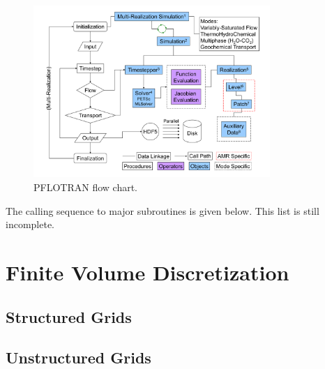 \documentclass[12pt]{article}
\begin{document}
\begin{figure}[ht]\centering
\includegraphics[width=0.8\textwidth]{./figs/multi-realization_flowchart}

\vspace{3mm}

\caption{PFLOTRAN flow chart.}
\label{fchart}
\end{figure}

\noindent
The calling sequence to major subroutines is given below. This list is still incomplete.


\normalsize


\section{Finite Volume Discretization}

\subsection{Structured Grids}

\subsection{Unstructured Grids}
\end{document}
